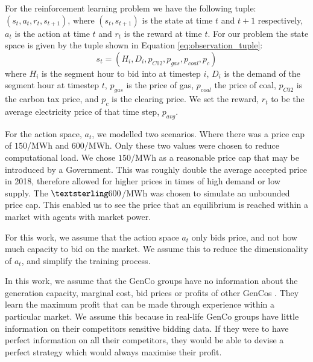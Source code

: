 For the reinforcement learning problem we have the following tuple: $(s_t,a_t,r_t,s_{t+1})$, where $(s_t, s_{t+1})$ is the state at time $t$ and $t+1$ respectively, $a_t$ is the action at time $t$ and $r_t$ is the reward at time $t$. For our problem the state space is given by the tuple shown in Equation \ref{eq:observation_tuple}:
\begin{equation}
\label{eq:observation_tuple}
s_t=(H_i,D_i,p_{C02},p_{gas},p_{coal},p_{c})
\end{equation}
\noindent where $H_i$ is the segment hour to bid into at timestep $i$, $D_i$ is the demand of the segment hour at timestep $t$, $p_{gas}$ is the price of gas, $p_{coal}$ the price of coal, $p_{C02}$ is the carbon tax price, and $p_{c}$ is the clearing price. We set the reward, $r_t$ to be the average electricity price of that time step, $p_{avg}$.

For the action space, $a_t$, we modelled two scenarios. Where there was a price cap of \textsterling$150$/MWh and \textsterling$600$/MWh. Only these two values were chosen to reduce computational load. We chose \textsterling$150$/MWh as a reasonable price cap that may be introduced by a Government. This was roughly double the average accepted price in 2018, therefore allowed for higher prices in times of high demand or low supply. The $\textsterling 600$/MWh was chosen to simulate an unbounded price cap. This enabled us to see the price that an equilibrium is reached within a market with agents with market power. 

For this work, we assume that the action space $a_t$ only bids price, and not how much capacity to bid on the market. We assume this to reduce the dimensionality of $a_t$, and simplify the training process.

In this work, we assume that the GenCo groups have no information about the generation capacity, marginal cost, bid prices or profits of other GenCos \cite{EsmaeiliAliabadi2017}. They learn the maximum profit that can be made through experience within a particular market. We assume this because in real-life GenCo groups have little information on their competitors sensitive bidding data. If they were to have perfect information on all their competitors, they would be able to devise a perfect strategy which would always maximise their profit.


